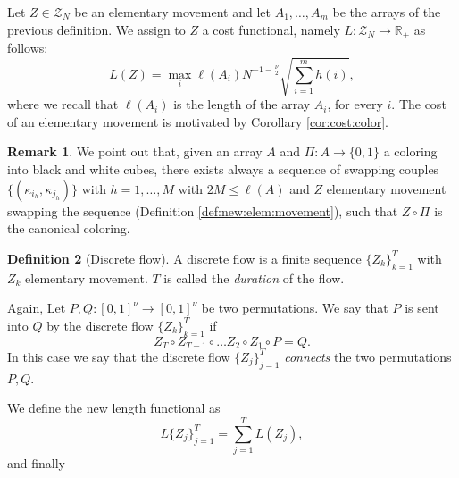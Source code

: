 \documentclass[12 pt]{article}
\theoremstyle{definition} \newtheorem{definition}{Definition}[section]
\theoremstyle{definition} \newtheorem{remark}[definition]{Remark}
\theoremstyle{plain} \newtheorem{lemma}[definition]{Lemma}
\theoremstyle{plain} \newtheorem{proposition}[definition]{Proposition}
\theoremstyle{plain} \newtheorem{theorem}[definition]{Theorem}
\theoremstyle{plain} \newtheorem{corollary}[definition]{Corollary}
\theoremstyle{definition} \newtheorem{example}[definition]{Example}
\theoremstyle{definition} \newtheorem{assumption}[definition]{Assumption}
\theoremstyle{definition} \newtheorem{conjecture}[definition]{Conjecture}
\newcommand{\R}{\mathbb{R}}
\newcommand{\1}{\mathbbm 1}
\numberwithin{equation}{section}
\begin{document}
   Let $Z\in\mathcal{Z}_N$ be an elementary movement and let $A_1,\dots,A_m$ be the arrays of the previous definition. We assign to $Z$ a cost functional, namely $L:\mathcal Z_N\rightarrow\R_+$ as follows:
   \begin{equation}\label{eq:cost:elem:movem}
       L(Z)= \max_{i}\ell(A_i)N^{-1-\frac{\nu}{2}}\sqrt{\sum_{i=1}^m h(i)},
   \end{equation}
   where we recall that $\ell(A_i)$ is the length of the array $A_i$, for every $i$. The cost of an elementary movement is motivated by Corollary \ref{cor:cost:color}.
   \begin{remark}
       We point out that, given an array $A$ and $\Pi:A\rightarrow\lbrace 0,1\rbrace$ a coloring into black and white cubes, there exists always a sequence of swapping couples $\lbrace (\kappa_{i_h},\kappa_{j_h})\rbrace$ with $h=1,\dots,M$ with $2M\leq \ell(A)$ and $Z$ elementary movement swapping the sequence (Definition \ref{def:new:elem:movement}), such that $Z\circ \Pi$ is the canonical coloring. 
   \end{remark}
\begin{definition}[Discrete flow]\label{def:discrete:flow}
    A discrete flow is a finite sequence $\lbrace Z_k\rbrace _{k=1}^T $ with $Z_k$ elementary movement. $T$ is called the \emph{duration} of the flow.
\end{definition}
Again, Let $P,Q:[0,1]^\nu\rightarrow [0,1]^\nu$ be two permutations.
  We say that $P$ is sent into $Q$ by the discrete flow $\lbrace Z_k\rbrace_{k=1}^T$ if
\begin{equation*}
    Z_T\circ Z_{T-1}\circ \dots Z_2 \circ Z_1\circ P=Q.
\end{equation*}
In this case we say that the discrete flow $\lbrace Z_j\rbrace_{j=1}^T$ \emph{connects} the two permutations $P,Q$.  

\medskip 

We define the  new length functional as
\begin{equation}\label{eq:discr:length:new}
    L\lbrace Z_j\rbrace_{j=1}^T=\sum_{j=1}^{T} L(Z_j),
\end{equation}
and finally 
\end{document}
